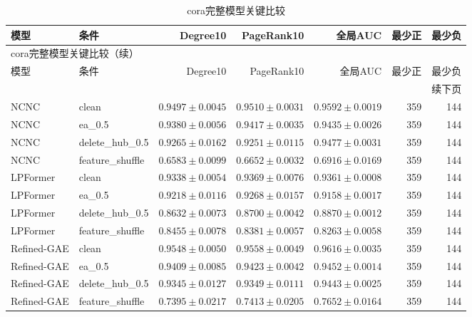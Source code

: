 \documentclass[UTF8,a4paper,11pt,fontset=fandol]{ctexart}
\begin{document}
{\footnotesize
\setlength{\tabcolsep}{3pt}
\begin{longtable}{llrrr rr}
\caption{cora完整模型关键比较}\\
\toprule
模型 & 条件 & Degree10 & PageRank10 & 全局AUC & 最少正 & 最少负 \\
\midrule
\endfirsthead
\multicolumn{7}{l}{cora完整模型关键比较（续）}\\
\toprule
模型 & 条件 & Degree10 & PageRank10 & 全局AUC & 最少正 & 最少负 \\
\midrule
\endhead
\midrule\multicolumn{7}{r}{续下页}\\
\endfoot
\bottomrule\endlastfoot
NCNC & clean & $0.9497\pm0.0045$ & $0.9510\pm0.0031$ & $0.9592\pm0.0019$ & 359 & 144 \\
NCNC & ea\_0.5 & $0.9380\pm0.0056$ & $0.9417\pm0.0035$ & $0.9435\pm0.0026$ & 359 & 144 \\
NCNC & delete\_hub\_0.5 & $0.9265\pm0.0162$ & $0.9251\pm0.0115$ & $0.9477\pm0.0031$ & 359 & 144 \\
NCNC & feature\_shuffle & $0.6583\pm0.0099$ & $0.6652\pm0.0032$ & $0.6916\pm0.0169$ & 359 & 144 \\
LPFormer & clean & $0.9338\pm0.0054$ & $0.9369\pm0.0076$ & $0.9361\pm0.0008$ & 359 & 144 \\
LPFormer & ea\_0.5 & $0.9218\pm0.0116$ & $0.9268\pm0.0157$ & $0.9158\pm0.0017$ & 359 & 144 \\
LPFormer & delete\_hub\_0.5 & $0.8632\pm0.0073$ & $0.8700\pm0.0042$ & $0.8870\pm0.0012$ & 359 & 144 \\
LPFormer & feature\_shuffle & $0.8455\pm0.0078$ & $0.8381\pm0.0057$ & $0.8263\pm0.0058$ & 359 & 144 \\
Refined-GAE & clean & $0.9548\pm0.0050$ & $0.9558\pm0.0049$ & $0.9616\pm0.0035$ & 359 & 144 \\
Refined-GAE & ea\_0.5 & $0.9409\pm0.0085$ & $0.9423\pm0.0042$ & $0.9452\pm0.0014$ & 359 & 144 \\
Refined-GAE & delete\_hub\_0.5 & $0.9345\pm0.0127$ & $0.9349\pm0.0111$ & $0.9443\pm0.0025$ & 359 & 144 \\
Refined-GAE & feature\_shuffle & $0.7395\pm0.0217$ & $0.7413\pm0.0205$ & $0.7652\pm0.0164$ & 359 & 144 \\
\end{longtable}
}
\end{document}
